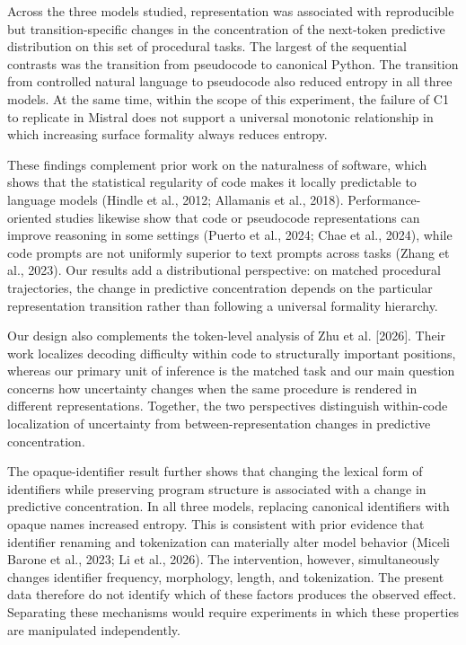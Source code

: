 \documentclass[sn-mathphys-num]{sn-jnl}
\begin{document}
Across the three models studied, representation was associated with reproducible but transition-specific changes in the concentration of the next-token predictive distribution on this set of procedural tasks. The largest of the sequential contrasts was the transition from pseudocode to canonical Python. The transition from controlled natural language to pseudocode also reduced entropy in all three models. At the same time, within the scope of this experiment, the failure of C1 to replicate in Mistral does not support a universal monotonic relationship in which increasing surface formality always reduces entropy.

These findings complement prior work on the naturalness of software, which shows that the statistical regularity of code makes it locally predictable to language models (Hindle et al., 2012; Allamanis et al., 2018). Performance-oriented studies likewise show that code or pseudocode representations can improve reasoning in some settings (Puerto et al., 2024; Chae et al., 2024), while code prompts are not uniformly superior to text prompts across tasks (Zhang et al., 2023). Our results add a distributional perspective: on matched procedural trajectories, the change in predictive concentration depends on the particular representation transition rather than following a universal formality hierarchy.

Our design also complements the token-level analysis of Zhu et al. [2026]. Their work localizes decoding difficulty within code to structurally important positions, whereas our primary unit of inference is the matched task and our main question concerns how uncertainty changes when the same procedure is rendered in different representations. Together, the two perspectives distinguish within-code localization of uncertainty from between-representation changes in predictive concentration.

The opaque-identifier result further shows that changing the lexical form of identifiers while preserving program structure is associated with a change in predictive concentration. In all three models, replacing canonical identifiers with opaque names increased entropy. This is consistent with prior evidence that identifier renaming and tokenization can materially alter model behavior (Miceli Barone et al., 2023; Li et al., 2026). The intervention, however, simultaneously changes identifier frequency, morphology, length, and tokenization. The present data therefore do not identify which of these factors produces the observed effect. Separating these mechanisms would require experiments in which these properties are manipulated independently.
\end{document}
